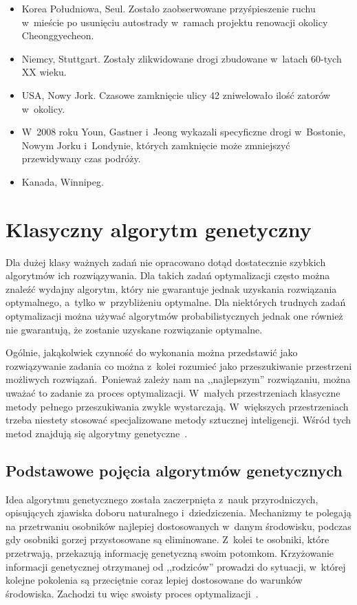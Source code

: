 \documentclass[twoside,12pt]{report}
\begin{document}
\begin{itemize}
\item Korea Południowa, Seul. Zostało zaobserwowane przyśpieszenie ruchu w~mieście po usunięciu autostrady w~ramach projektu renowacji okolicy Cheonggyecheon.

\item Niemcy, Stuttgart. Zostały zlikwidowane drogi zbudowane w~latach 60-tych XX wieku.

\item USA, Nowy Jork. Czasowe zamknięcie ulicy 42 zniwelowało ilość zatorów w~okolicy.

\item W~2008 roku Youn, Gastner i~Jeong wykazali specyficzne drogi w~Bostonie, Nowym Jorku i~Londynie, których zamknięcie może zmniejszyć przewidywany czas podróży.

\item Kanada, Winnipeg.
\end{itemize}

\section{Klasyczny algorytm genetyczny}
Dla dużej klasy ważnych zadań nie opracowano dotąd dostatecznie szybkich algorytmów ich rozwiązywania. Dla takich zadań optymalizacji często można znaleźć wydajny algorytm, który nie gwarantuje jednak uzyskania rozwiązania optymalnego, a~tylko w~przybliżeniu optymalne. Dla niektórych trudnych zadań optymalizacji można używać algorytmów probabilistycznych jednak one również nie gwarantują, że zostanie uzyskane rozwiązanie optymalne.

Ogólnie, jakąkolwiek czynność do wykonania można przedstawić jako rozwiązywanie zadania co można z~kolei rozumieć jako przeszukiwanie przestrzeni możliwych rozwiązań.~Ponieważ zależy nam na ,,najlepszym'' rozwiązaniu, można uważać to zadanie za proces optymalizacji. W~małych przestrzeniach klasyczne metody pełnego przeszukiwania zwykle wystarczają. W~większych przestrzeniach trzeba niestety stosować specjalizowane metody sztucznej inteligencji. Wśród tych metod znajdują się algorytmy genetyczne~\cite{genetyczne-dane=ewo}.

\subsection{Podstawowe pojęcia algorytmów genetycznych}
Idea algorytmu genetycznego została zaczerpnięta z~nauk przyrodniczych, opisujących zjawiska doboru naturalnego i~dziedziczenia. Mechanizmy te polegają na przetrwaniu osobników najlepiej dostosowanych w~danym środowisku, podczas gdy osobniki gorzej przystosowane są eliminowane. Z~kolei te osobniki, które przetrwają, przekazują informację genetyczną swoim potomkom. Krzyżowanie informacji genetycznej otrzymanej od ,,rodziców'' prowadzi do sytuacji, w~której kolejne pokolenia są przeciętnie coraz lepiej dostosowane do warunków środowiska. Zachodzi tu więc swoisty proces optymalizacji~\cite{genetyczne}. 
\end{document}
